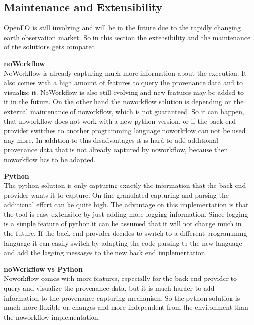 \documentclass[draft,final]{vutinfth} %
\begin{document}
\subsection{Maintenance and Extensibility}\label{NvsP:Maintenance and Extensibility}
OpenEO is still involving and will be in the future due to the rapidly changing earth observation market. So in this section the extensibility and the maintenance of the solutions gets compared. 

\textbf{noWorkflow} \\
NoWorkflow is already capturing much more information about the execution. It also comes with a high amount of features to query the provenance data and to visualize it. NoWorkflow is also still evolving and new features may be added to it in the future. On the other hand the noworkflow solution is depending on the external maintenance of noworkflow, which is not guaranteed. So it can happen, that noworkflow does not work with a new python version, or if the back end provider switches to another programming language noworkflow can not be used any more. In addition to this disadvantages it is hard to add additional provenance data that is not already captured by noworkflow, because then noworkflow has to be adapted.

\textbf{Python} \\
The python solution is only capturing exactly the information that the back end provider wants it to capture. On fine granulated capturing and parsing the additional effort can be quite high. The advantage on this implementation is that the tool is easy extensible by just adding more logging information. Since logging is a simple feature of python it can be assumed that it will not change much in the future. If the back end provider decides to switch to a different programming language it can easily switch by adapting the code parsing to the new language and add the logging messages to the new back end implementation. 

\textbf{noWorkflow vs Python} \\
Noworkflow comes with more features, especially for the back end provider to query and visualize the provenance data, but it is much harder to add information to the provenance capturing mechanism. So the python solution is much more flexible on changes and more independent from the environment than the noworkflow implementation.  
\end{document}
